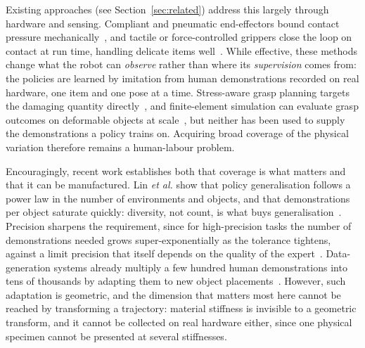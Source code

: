 Existing approaches (see Section~\ref{sec:related}) address this largely through hardware and
sensing. Compliant and pneumatic end-effectors bound contact pressure
mechanically~\cite{wang2024softgripper}, and tactile or force-controlled grippers close the
loop on contact at run time, handling delicate items well~\cite{kang2026learning,vtam}. While
effective, these methods change what the robot can \emph{observe} rather than where its
\emph{supervision} comes from: the policies are learned by imitation from human demonstrations
recorded on real hardware, one item and one pose at a time. Stress-aware grasp planning targets
the damaging quantity directly~\cite{pan2020stressmin}, and finite-element simulation can
evaluate grasp outcomes on deformable objects at scale~\cite{defgraspsim}, but neither has been
used to supply the demonstrations a policy trains on. Acquiring broad coverage of the physical
variation therefore remains a human-labour problem.

Encouragingly, recent work establishes both that coverage is what matters and that it can be
manufactured. Lin \emph{et al.} show that policy generalisation follows a power law in the
number of environments and objects, and that demonstrations per object saturate quickly:
diversity, not count, is what buys generalisation~\cite{lin2025datascaling}. Precision sharpens
the requirement, since for high-precision tasks the number of demonstrations needed grows
super-exponentially as the tolerance tightens, against a limit precision that itself depends on
the quality of the expert~\cite{curseofprecision}. Data-generation systems already multiply a
few hundred human demonstrations into tens of thousands by adapting them to new object
placements~\cite{mandlekar2023mimicgen}. However, such adaptation is geometric, and the
dimension that matters most here cannot be reached by transforming a trajectory: material
stiffness is invisible to a geometric transform, and it cannot be collected on real hardware
either, since one physical specimen cannot be presented at several stiffnesses.

